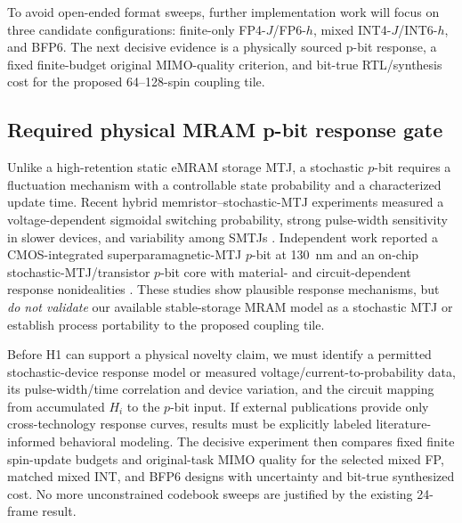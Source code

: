 \documentclass[11pt,a4paper]{article}
\begin{document}
To avoid open-ended format sweeps, further implementation
work will focus on three candidate configurations:
finite-only FP4-$J$/FP6-$h$, mixed INT4-$J$/INT6-$h$,
and BFP6. The next decisive evidence is a physically
sourced p-bit response, a fixed finite-budget original
MIMO-quality criterion, and bit-true RTL/synthesis
cost for the proposed 64--128-spin coupling tile.

\subsection{Required physical MRAM p-bit response gate}
Unlike a high-retention static eMRAM storage MTJ, a stochastic
$p$-bit requires a fluctuation mechanism with a controllable
state probability and a characterized update time. Recent
hybrid memristor--stochastic-MTJ experiments measured a
voltage-dependent sigmoidal switching probability, strong
pulse-width sensitivity in slower devices, and variability
among SMTJs \cite{hybrid2026}. Independent work reported a
CMOS-integrated superparamagnetic-MTJ $p$-bit at 130~nm
\cite{cacoilo2026} and an on-chip stochastic-MTJ/transistor
$p$-bit core with material- and circuit-dependent response
nonidealities \cite{daniel2024}. These studies show plausible
response mechanisms, but \emph{do not validate} our
available stable-storage MRAM model as a stochastic MTJ or
establish process portability to the proposed coupling tile.

Before H1 can support a physical novelty claim, we must
identify a permitted stochastic-device response model
or measured voltage/current-to-probability data, its
pulse-width/time correlation and device variation, and
the circuit mapping from accumulated $H_i$ to the
$p$-bit input. If external publications provide only
cross-technology response curves, results must be
explicitly labeled literature-informed behavioral modeling.
The decisive experiment then compares fixed finite
spin-update budgets and original-task MIMO quality for
the selected mixed FP, matched mixed INT, and BFP6
designs with uncertainty and bit-true synthesized cost.
No more unconstrained codebook sweeps are justified
by the existing 24-frame result.
\end{document}
